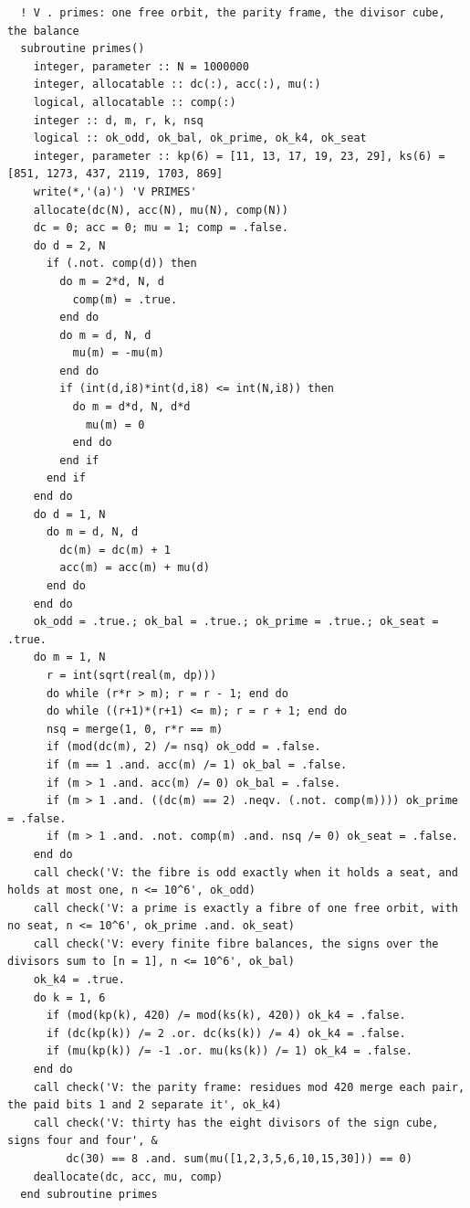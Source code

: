 \documentclass[10pt,twocolumn]{article}
\begin{document}
\begin{Verbatim}
  ! V . primes: one free orbit, the parity frame, the divisor cube, the balance
  subroutine primes()
    integer, parameter :: N = 1000000
    integer, allocatable :: dc(:), acc(:), mu(:)
    logical, allocatable :: comp(:)
    integer :: d, m, r, k, nsq
    logical :: ok_odd, ok_bal, ok_prime, ok_k4, ok_seat
    integer, parameter :: kp(6) = [11, 13, 17, 19, 23, 29], ks(6) = [851, 1273, 437, 2119, 1703, 869]
    write(*,'(a)') 'V PRIMES'
    allocate(dc(N), acc(N), mu(N), comp(N))
    dc = 0; acc = 0; mu = 1; comp = .false.
    do d = 2, N
      if (.not. comp(d)) then
        do m = 2*d, N, d
          comp(m) = .true.
        end do
        do m = d, N, d
          mu(m) = -mu(m)
        end do
        if (int(d,i8)*int(d,i8) <= int(N,i8)) then
          do m = d*d, N, d*d
            mu(m) = 0
          end do
        end if
      end if
    end do
    do d = 1, N
      do m = d, N, d
        dc(m) = dc(m) + 1
        acc(m) = acc(m) + mu(d)
      end do
    end do
    ok_odd = .true.; ok_bal = .true.; ok_prime = .true.; ok_seat = .true.
    do m = 1, N
      r = int(sqrt(real(m, dp)))
      do while (r*r > m); r = r - 1; end do
      do while ((r+1)*(r+1) <= m); r = r + 1; end do
      nsq = merge(1, 0, r*r == m)
      if (mod(dc(m), 2) /= nsq) ok_odd = .false.
      if (m == 1 .and. acc(m) /= 1) ok_bal = .false.
      if (m > 1 .and. acc(m) /= 0) ok_bal = .false.
      if (m > 1 .and. ((dc(m) == 2) .neqv. (.not. comp(m)))) ok_prime = .false.
      if (m > 1 .and. .not. comp(m) .and. nsq /= 0) ok_seat = .false.
    end do
    call check('V: the fibre is odd exactly when it holds a seat, and holds at most one, n <= 10^6', ok_odd)
    call check('V: a prime is exactly a fibre of one free orbit, with no seat, n <= 10^6', ok_prime .and. ok_seat)
    call check('V: every finite fibre balances, the signs over the divisors sum to [n = 1], n <= 10^6', ok_bal)
    ok_k4 = .true.
    do k = 1, 6
      if (mod(kp(k), 420) /= mod(ks(k), 420)) ok_k4 = .false.
      if (dc(kp(k)) /= 2 .or. dc(ks(k)) /= 4) ok_k4 = .false.
      if (mu(kp(k)) /= -1 .or. mu(ks(k)) /= 1) ok_k4 = .false.
    end do
    call check('V: the parity frame: residues mod 420 merge each pair, the paid bits 1 and 2 separate it', ok_k4)
    call check('V: thirty has the eight divisors of the sign cube, signs four and four', &
         dc(30) == 8 .and. sum(mu([1,2,3,5,6,10,15,30])) == 0)
    deallocate(dc, acc, mu, comp)
  end subroutine primes


\end{Verbatim}
\end{document}
